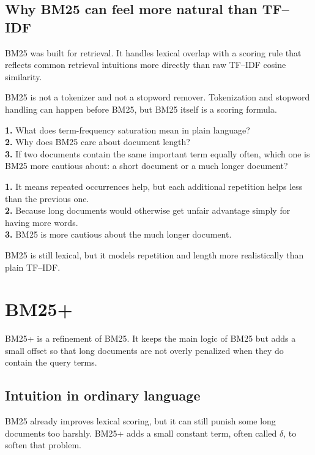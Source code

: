 \documentclass[11pt,oneside]{report}
\begin{document}
\section*{Why BM25 can feel more natural than TF--IDF}
BM25 was built for retrieval. It handles lexical overlap with a scoring rule that reflects common retrieval intuitions more directly than raw TF--IDF cosine similarity.

\begin{warningbox}
BM25 is not a tokenizer and not a stopword remover. Tokenization and stopword handling can happen before BM25, but BM25 itself is a scoring formula.
\end{warningbox}

\begin{selfcheckbox}
\textbf{1.} What does term-frequency saturation mean in plain language?\\
\textbf{2.} Why does BM25 care about document length?\\
\textbf{3.} If two documents contain the same important term equally often, which one is BM25 more cautious about: a short document or a much longer document?
\end{selfcheckbox}

\begin{answerbox}
\textbf{1.} It means repeated occurrences help, but each additional repetition helps less than the previous one.\\
\textbf{2.} Because long documents would otherwise get unfair advantage simply for having more words.\\
\textbf{3.} BM25 is more cautious about the much longer document.
\end{answerbox}

\begin{rememberbox}
BM25 is still lexical, but it models repetition and length more realistically than plain TF--IDF.
\end{rememberbox}


\chapter{BM25+}

\begin{purposebox}
BM25+ is a refinement of BM25. It keeps the main logic of BM25 but adds a small offset so that long documents are not overly penalized when they do contain the query terms.
\end{purposebox}

\section*{Intuition in ordinary language}
BM25 already improves lexical scoring, but it can still punish some long documents too harshly. BM25+ adds a small constant term, often called $\delta$, to soften that problem.
\end{document}
